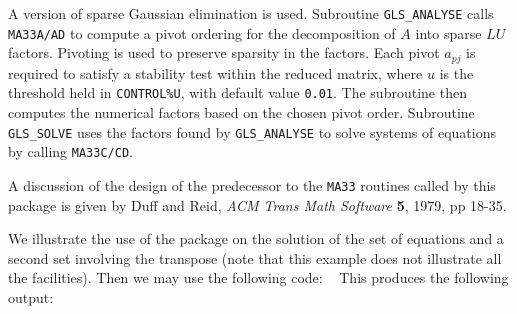\documentclass{galahad}
\newcommand{\packagename}{GLS}
\begin{document}

\galmethod

A version of sparse Gaussian elimination is used.
Subroutine {\tt \packagename\_ANALYSE} calls {\tt MA33A/AD}
to compute a pivot ordering for the decomposition of {$A$} into
sparse $LU$ factors. Pivoting is used to preserve sparsity in the
factors. Each pivot $a_{pj}$ is required to satisfy a stability test
\noindent within the reduced matrix, where $u$ is the threshold held in
{\tt CONTROL\%U}, with default value {\tt 0.01}.  The subroutine
then computes the numerical factors based on the chosen pivot order.
Subroutine {\tt \packagename\_SOLVE} uses the factors found by
{\tt \packagename\_ANALYSE} to solve systems of equations by
calling {\tt MA33C/CD}.

A discussion of the design of the predecessor to the {\tt MA33} routines
called by this package is given by
Duff and Reid, {\it ACM Trans Math Software} {\bf 5},  1979, pp 18-35.



\galexample

We illustrate the use of the package on the solution of the
set of equations
and a second set
involving the transpose
(note that this example does not illustrate all the facilities).
Then we may use the following code:
{\tt \small
\VerbatimInput{\packageexample}
}
\noindent
\noindent
This produces the following output:
{\tt \small
\VerbatimInput{\packageresults}
}
\noindent
\end{document}

